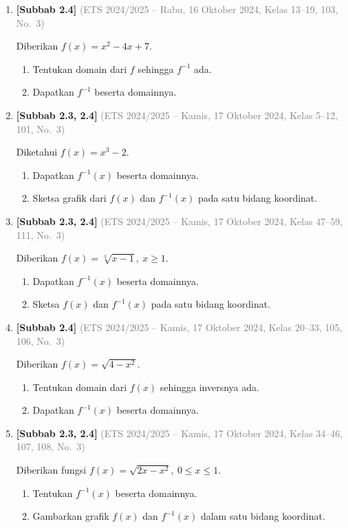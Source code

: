 \documentclass[10pt,openany,a4paper]{article}
\theoremstyle{definition}
\theoremstyle{definition}
\theoremstyle{plain}
\begin{document}
\begin{enumerate}
    \item \textbf{[Subbab 2.4]} {\footnotesize\textcolor{gray}{(ETS 2024/2025 -- Rabu, 16 Oktober 2024, Kelas 13--19, 103, No.~3)}}\par
    Diberikan $f(x)=x^2-4x+7$.
    \begin{enumerate}
        \item Tentukan domain dari $f$ sehingga $f^{-1}$ ada.
        \item Dapatkan $f^{-1}$ beserta domainnya.
    \end{enumerate}

    \item \textbf{[Subbab 2.3, 2.4]} {\footnotesize\textcolor{gray}{(ETS 2024/2025 -- Kamis, 17 Oktober 2024, Kelas 5--12, 101, No.~3)}}\par
    Diketahui $f(x)=x^3-2$.
    \begin{enumerate}
        \item Dapatkan $f^{-1}(x)$ beserta domainnya.
        \item Sketsa grafik dari $f(x)$ dan $f^{-1}(x)$ pada satu bidang koordinat.
    \end{enumerate}

    \item \textbf{[Subbab 2.3, 2.4]} {\footnotesize\textcolor{gray}{(ETS 2024/2025 -- Kamis, 17 Oktober 2024, Kelas 47--59, 111, No.~3)}}\par
    Diberikan $f(x)=\sqrt[3]{x-1},\ x\geq 1$.
    \begin{enumerate}
        \item Dapatkan $f^{-1}(x)$ beserta domainnya.
        \item Sketsa $f(x)$ dan $f^{-1}(x)$ pada satu bidang koordinat.
    \end{enumerate}

    \item \textbf{[Subbab 2.4]} {\footnotesize\textcolor{gray}{(ETS 2024/2025 -- Kamis, 17 Oktober 2024, Kelas 20--33, 105, 106, No.~3)}}\par
    Diberikan $f(x)=\sqrt{4-x^2}$.
    \begin{enumerate}
        \item Tentukan domain dari $f(x)$ sehingga inversnya ada.
        \item Dapatkan $f^{-1}(x)$ beserta domainnya.
    \end{enumerate}

    \item \textbf{[Subbab 2.3, 2.4]} {\footnotesize\textcolor{gray}{(ETS 2024/2025 -- Kamis, 17 Oktober 2024, Kelas 34--46, 107, 108, No.~3)}}\par
    Diberikan fungsi $f(x)=\sqrt{2x-x^2},\ 0\leq x\leq 1$.
    \begin{enumerate}
        \item Tentukan $f^{-1}(x)$ beserta domainnya.
        \item Gambarkan grafik $f(x)$ dan $f^{-1}(x)$ dalam satu bidang koordinat.
    \end{enumerate}


\end{enumerate}
\end{document}
